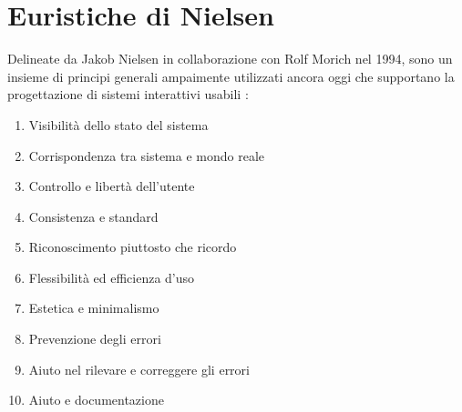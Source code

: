 \chapter{Euristiche di Nielsen}
\label{sec:euristiche_nielsen}
Delineate da Jakob Nielsen in collaborazione con Rolf Morich nel 1994, sono un insieme di principi generali 
ampaimente utilizzati ancora oggi  che supportano la progettazione di sistemi interattivi usabili \cite{AppuntiEuristicheNielsen}:

\begin{enumerate}
    \item Visibilità dello stato del sistema
    \item Corrispondenza tra sistema e mondo reale
    \label{sec:euristiche_nielsen2}
    \item Controllo e libertà dell'utente
    \item Consistenza e standard 
    \item Riconoscimento piuttosto che ricordo
    \item Flessibilità ed efficienza d’uso 
    \label{sec:euristiche_nielsen6}
    \item Estetica e minimalismo  
    \label{sec:euristiche_nielsen7} 
    \item Prevenzione degli errori
    \label{sec:euristiche_nielsen8}
    \item Aiuto nel rilevare e correggere gli errori 
    \label{sec:euristiche_nielsen9}
    \item Aiuto e documentazione
\end{enumerate}

